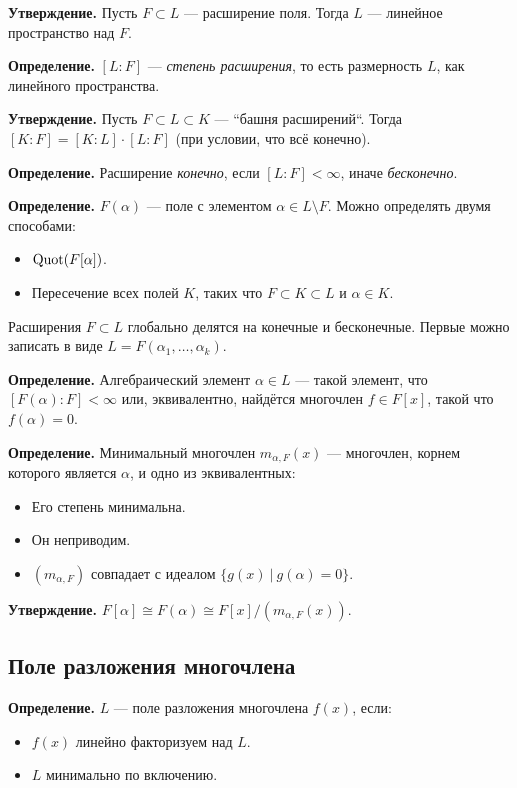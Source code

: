 \textbf{Утверждение.} Пусть $F \subset L$ --- расширение поля. Тогда $L$ --- линейное пространство над $F$.

\textbf{Определение.} $[L:F]$ --- \textit{степень расширения}, то есть размерность $L$, как линейного пространства.

\textbf{Утверждение.} Пусть $F \subset L \subset K$ --- ``башня расширений``.
Тогда $[K:F] = [K:L] \cdot [L:F]$ (при условии, что всё конечно).

\textbf{Определение.} Расширение \textit{конечно}, если $[L:F] < \infty$, иначе \textit{бесконечно}.

\textbf{Определение.} $F(\alpha)$ --- поле с элементом $\alpha \in L \setminus F$.
Можно определять двумя способами:
\begin{itemize}
    \item $\operatorname{Quot}(F[\alpha])$.
    \item Пересечение всех полей $K$, таких что $F \subset K \subset L$ и $\alpha \in K$.
\end{itemize}

Расширения $F \subset L$ глобально делятся на конечные и бесконечные.
Первые можно записать в виде $L = F(\alpha_1, \dots, \alpha_k)$.

\textbf{Определение.} Алгебраический элемент $\alpha \in L$ --- такой элемент, что $[F(\alpha) : F] < \infty$ или, эквивалентно, найдётся многочлен $f \in F[x]$, такой что $f(\alpha) = 0$.

\textbf{Определение.} Минимальный многочлен $m_{\alpha, F}(x)$ --- многочлен, корнем которого является $\alpha$, и одно из эквивалентных:
\begin{itemize}
    \item Его степень минимальна.
    \item Он неприводим.
    \item $(m_{\alpha, F})$ совпадает с идеалом $\{g(x)~|~g(\alpha) = 0\}$.
\end{itemize}

\textbf{Утверждение.} $F[\alpha] \cong F(\alpha) \cong F[x] / (m_{\alpha, F}(x))$.

\subsection{Поле разложения многочлена}
\textbf{Определение.} $L$ --- поле разложения многочлена $f(x)$, если:
\begin{itemize}
    \item $f(x)$ линейно факторизуем над $L$.
    \item $L$ минимально по включению.
\end{itemize}

